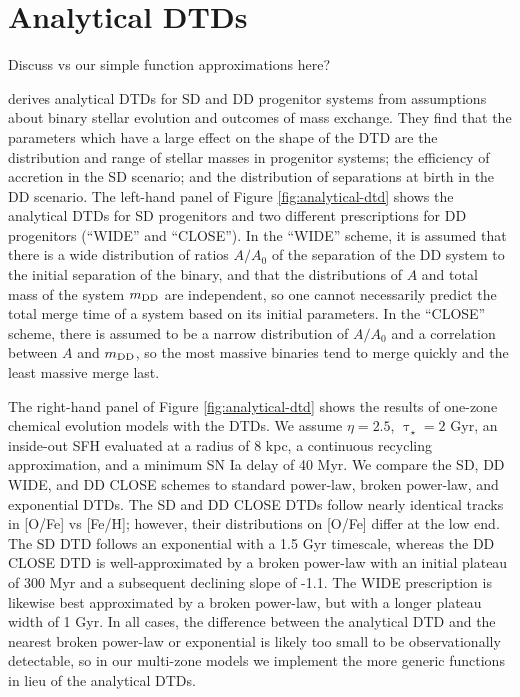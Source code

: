 \documentclass[twocolumn,twocolappendix,linenumbers,trackchanges]{aastex631}
\begin{document}
\section{Analytical DTDs}
\label{app:analytical-dtds}

Discuss \citet{Greggio2005-AnalyticalRates} vs our simple function approximations here?

\citet{Greggio2005-AnalyticalRates} derives analytical DTDs for SD and DD progenitor systems from assumptions about binary stellar evolution and outcomes of mass exchange. They find that the parameters which have a large effect on the shape of the DTD are the distribution and range of stellar masses in progenitor systems; the efficiency of accretion in the SD scenario; and the distribution of separations at birth in the DD scenario. The left-hand panel of Figure \ref{fig:analytical-dtd} shows the analytical DTDs for SD progenitors and two different prescriptions for DD progenitors (``WIDE'' and ``CLOSE''). In the ``WIDE'' scheme, it is assumed that there is a wide distribution of ratios $A/A_0$ of the separation of the DD system to the initial separation of the binary, and that the distributions of $A$ and total mass of the system $m_{\rm DD}$ are independent, so one cannot necessarily predict the total merge time of a system based on its initial parameters. In the ``CLOSE'' scheme, there is assumed to be a narrow distribution of $A/A_0$ and a correlation between $A$ and $m_{\rm DD}$, so the most massive binaries tend to merge quickly and the least massive merge last.

The right-hand panel of Figure \ref{fig:analytical-dtd} shows the results of one-zone chemical evolution models with the \citet{Greggio2005-AnalyticalRates} DTDs. We assume $\eta=2.5$, $\uptau_\star=2$ Gyr, an inside-out SFH evaluated at a radius of 8 kpc, a continuous recycling approximation, and a minimum SN Ia delay of 40 Myr. We compare the SD, DD WIDE, and DD CLOSE schemes to standard power-law, broken power-law, and exponential DTDs. The SD and DD CLOSE DTDs follow nearly identical tracks in [O/Fe] vs [Fe/H]; however, their distributions on [O/Fe] differ at the low end. The SD DTD follows an exponential with a 1.5 Gyr timescale, whereas the DD CLOSE DTD is well-approximated by a broken power-law with an initial plateau of 300 Myr and a subsequent declining slope of -1.1. The WIDE prescription is likewise best approximated by a broken power-law, but with a longer plateau width of 1 Gyr. In all cases, the difference between the analytical DTD and the nearest broken power-law or exponential is likely too small to be observationally detectable, so in our multi-zone models we implement the more generic functions in lieu of the analytical DTDs.
\end{document}
